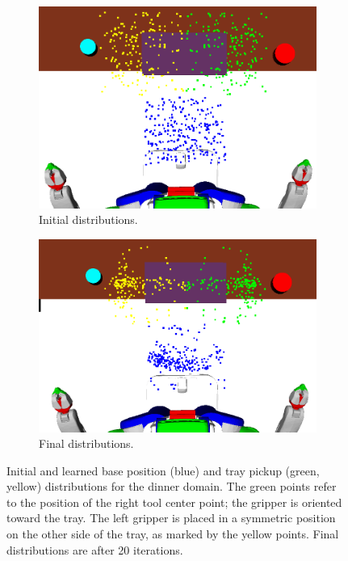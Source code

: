 \begin{figure}[t]
  \centering
  \begin{subfigure}[b]{0.45\linewidth}
    \includegraphics[width=\textwidth]{images/dinner_tray_initial.png}
    \caption{Initial distributions.}
  \end{subfigure}
  \begin{subfigure}[b]{0.45\linewidth}
    \includegraphics[width=\textwidth]{images/dinner_tray_final.png}
    \caption{Final distributions.}
  \end{subfigure}
  \caption{\small{Initial and learned base position (blue) and tray pickup (green, yellow) distributions
for the dinner domain. The green points refer to the position of the right tool center point; the gripper
is oriented toward the tray. The left gripper is placed in a symmetric position on the other side of
the tray, as marked by the yellow points. Final distributions are after 20 iterations.}}
  \label{fig:dinner}
\end{figure}


